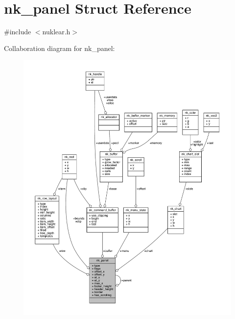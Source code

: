 \hypertarget{structnk__panel}{}\section{nk\+\_\+panel Struct Reference}
\label{structnk__panel}


{\ttfamily \#include $<$nuklear.\+h$>$}



Collaboration diagram for nk\+\_\+panel\+:
\nopagebreak
\begin{figure}[H]
\begin{center}
\leavevmode
\includegraphics[width=350pt]{structnk__panel__coll__graph}
\end{center}
\end{figure}
